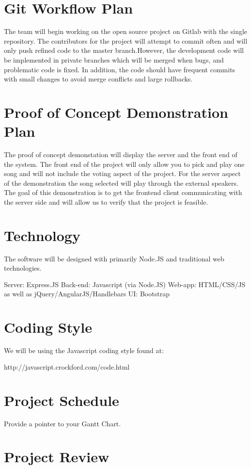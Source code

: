 \documentclass{article}
\begin{document}
\section{Git Workflow Plan}
The team will begin working on the open source project on Gitlab with the single repository. The contributors for the project will attempt to commit often and will only push refined code to the master branch.However, the development code will be implemented in private branches which will be merged when bugs, and problematic code is fixed. In addition, the code should have frequent commits with small changes to avoid merge conflicts and large rollbacks.
\section{Proof of Concept Demonstration Plan}
The proof of concept demonstation will display the server and the front end of the system. The front end of the project will only allow you to pick and play one song and will not include the voting aspect of the project. For the server aspect of the demonstration the song selected will play through the external speakers. The goal of this demonstration is to get the frontend client communicating with the server side and will allow us to verify that the project is feasible.
\section{Technology}
The software will be designed with primarily Node.JS and traditional web technologies.

Server: Express.JS
Back-end: Javascript (via Node.JS)
Web-app: HTML/CSS/JS as well as jQuery/AngularJS/Handlebars
UI: Bootstrap

\section{Coding Style}
We will be using the Javascript coding style found at:

http://javascript.crockford.com/code.html

\section{Project Schedule}
Provide a pointer to your Gantt Chart.

\section{Project Review}
\end{document}
